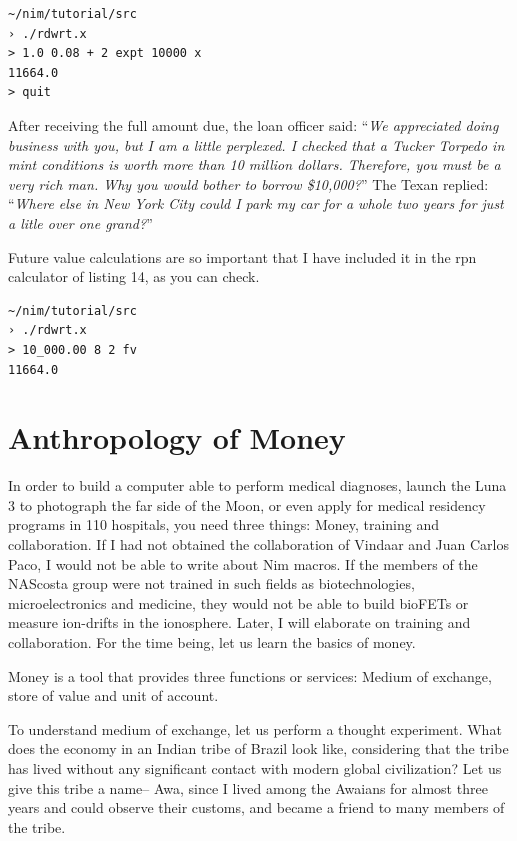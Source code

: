 \documentclass[
  12pt,
]{book}
\begin{document}
\begin{verbatim}
~/nim/tutorial/src
› ./rdwrt.x
> 1.0 0.08 + 2 expt 10000 x
11664.0
> quit
\end{verbatim}

After receiving the full amount due, the loan officer said: ``\emph{We
appreciated doing business with you, but I am a little perplexed. I
checked that a Tucker Torpedo in mint conditions is worth more than 10
million dollars. Therefore, you must be a very rich man. Why you would
bother to borrow \$10,000?}'' The Texan replied: ``\emph{Where else in
New York City could I park my car for a whole two years for just a litle
over one grand?}''

Future value calculations are so important that I have included it in
the rpn calculator of listing 14, as you can check.

\begin{verbatim}
~/nim/tutorial/src
› ./rdwrt.x
> 10_000.00 8 2 fv
11664.0
\end{verbatim}

\chapter{Anthropology of Money}\label{anthropology-of-money}

In order to build a computer able to perform medical diagnoses, launch
the Luna 3 to photograph the far side of the Moon, or even apply for
medical residency programs in 110 hospitals, you need three things:
Money, training and collaboration. If I had not obtained the
collaboration of Vindaar and Juan Carlos Paco, I would not be able to
write about Nim macros. If the members of the NAScosta group were not
trained in such fields as biotechnologies, microelectronics and
medicine, they would not be able to build bioFETs or measure ion-drifts
in the ionosphere. Later, I will elaborate on training and
collaboration. For the time being, let us learn the basics of money.

Money is a tool that provides three functions or services: Medium of
exchange, store of value and unit of account.

To understand medium of exchange, let us perform a thought experiment.
What does the economy in an Indian tribe of Brazil look like,
considering that the tribe has lived without any significant contact
with modern global civilization? Let us give this tribe a name-- Awa,
since I lived among the Awaians for almost three years and could observe
their customs, and became a friend to many members of the tribe.
\end{document}
